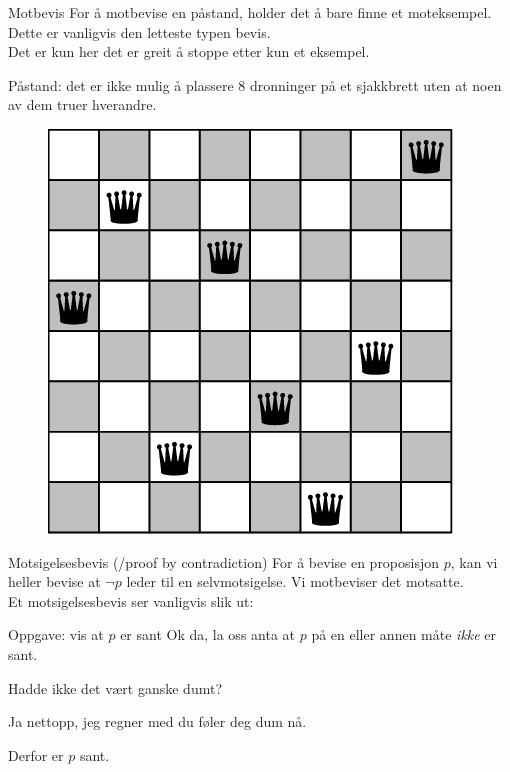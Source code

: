 \begin{frame}{Motbevis}
    For å motbevise en påstand, holder det å bare finne et moteksempel. Dette er vanligvis den letteste typen bevis.\\
    Det er kun her det er greit å stoppe etter kun et eksempel.
    \pause
    \begin{block}{Påstand: det er ikke mulig å plassere 8 dronninger på et sjakkbrett uten at noen av dem truer hverandre.}
    \pause
    \begin{figure}
        \centering
        \includegraphics[scale=0.20]{images/8 queens.png}
        \label{fig:my_label}
    \end{figure}
    
    \end{block}
\end{frame}

\begin{frame}{Motsigelsesbevis (/proof by contradiction)}
    For å bevise en proposisjon $p$, kan vi heller bevise at $\lnot p$ leder til en selvmotsigelse. 
    Vi motbeviser det motsatte.\\

    \pause
    Et motsigelsesbevis ser vanligvis slik ut:
    \begin{block}{Oppgave: vis at $p$ er sant}
        \pause
        Ok da, la oss anta at $p$ på en eller annen måte \emph{ikke} er sant.

        \pause
        Hadde ikke det vært ganske dumt?

        \pause
        Ja nettopp, jeg regner med du føler deg dum nå.

        \pause
        Derfor er $p$ sant.
    \end{block}
\end{frame}


